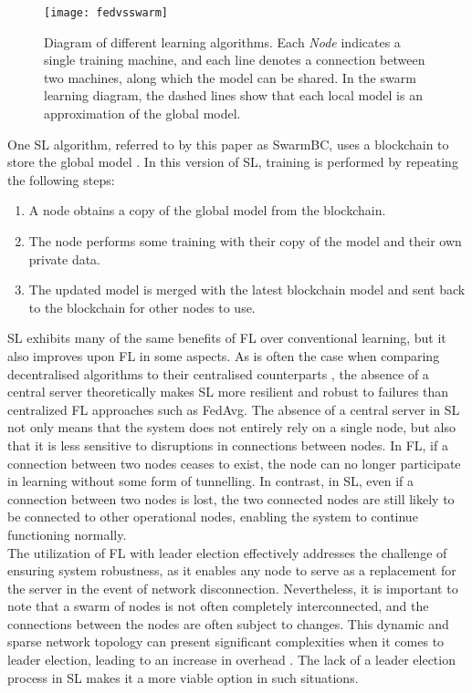 \begin{figure}[h]
	\texttt{[image: fedvsswarm]}
	\caption{Diagram of different learning algorithms. Each \emph{Node} indicates a single training machine, and each line denotes a connection between two machines, along which the model can be shared. In the swarm learning diagram, the dashed lines show that each local model is an approximation of the global model.} \label{fig_learning}
\end{figure}

One SL algorithm, referred to by this paper as SwarmBC, uses a blockchain to store the global model \cite{swarm_learning}. In this version of SL, training is performed by repeating the following steps:
\begin{enumerate}
	\item A node obtains a copy of the global model from the blockchain.
	\item The node performs some training with their copy of the model and their own private data.
	\item The updated model is merged with the latest blockchain model and sent back to the blockchain for other nodes to use.
\end{enumerate}

SL exhibits many of the same benefits of FL over conventional learning, but it also improves upon FL in some aspects. As is often the case when comparing decentralised algorithms to their centralised counterparts \cite{swarm_resil}, the absence of a central server theoretically makes SL more resilient and robust to failures than centralized FL approaches such as FedAvg. The absence of a central server in SL not only means that the system does not entirely rely on a single node, but also that it is less sensitive to disruptions in connections between nodes. In FL, if a connection between two nodes ceases to exist, the node can no longer participate in learning without some form of tunnelling. In contrast, in SL, even if a connection between two nodes is lost, the two connected nodes are still likely to be connected to other operational nodes, enabling the system to continue functioning normally. \\

The utilization of FL with leader election effectively addresses the challenge of ensuring system robustness, as it enables any node to serve as a replacement for the server in the event of network disconnection. Nevertheless, it is important to note that a swarm of nodes is not often completely interconnected, and the connections between the nodes are often subject to changes. This dynamic and sparse network topology can present significant complexities when it comes to leader election, leading to an increase in overhead \cite{leaderelection}. The lack of a leader election process in SL makes it a more viable option in such situations. \\

